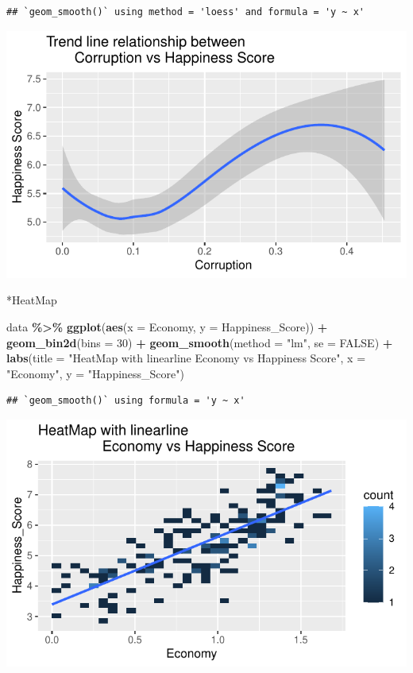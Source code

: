 \documentclass[
  11pt,
]{article}
\newenvironment{Shaded}{\begin{snugshade}}{\end{snugshade}}
\newcommand{\AttributeTok}[1]{\textcolor[rgb]{0.13,0.29,0.53}{#1}}
\newcommand{\ConstantTok}[1]{\textcolor[rgb]{0.56,0.35,0.01}{#1}}
\newcommand{\DecValTok}[1]{\textcolor[rgb]{0.00,0.00,0.81}{#1}}
\newcommand{\FunctionTok}[1]{\textcolor[rgb]{0.13,0.29,0.53}{\textbf{#1}}}
\newcommand{\NormalTok}[1]{#1}
\newcommand{\SpecialCharTok}[1]{\textcolor[rgb]{0.81,0.36,0.00}{\textbf{#1}}}
\newcommand{\StringTok}[1]{\textcolor[rgb]{0.31,0.60,0.02}{#1}}
\begin{document}
\begin{verbatim}
## `geom_smooth()` using method = 'loess' and formula = 'y ~ x'
\end{verbatim}

\begin{center}\includegraphics[width=0.7\linewidth]{Group_project_2_files/figure-latex/unnamed-chunk-13-1} \end{center}

*HeatMap

\begin{Shaded}
\begin{Highlighting}[]
\NormalTok{data }\SpecialCharTok{\%\textgreater{}\%}
\FunctionTok{ggplot}\NormalTok{(}\FunctionTok{aes}\NormalTok{(}\AttributeTok{x =}\NormalTok{ Economy, }\AttributeTok{y =}\NormalTok{ Happiness\_Score)) }\SpecialCharTok{+}
  \FunctionTok{geom\_bin2d}\NormalTok{(}\AttributeTok{bins =} \DecValTok{30}\NormalTok{) }\SpecialCharTok{+}  
  \FunctionTok{geom\_smooth}\NormalTok{(}\AttributeTok{method =} \StringTok{"lm"}\NormalTok{, }\AttributeTok{se =} \ConstantTok{FALSE}\NormalTok{) }\SpecialCharTok{+} 
  \FunctionTok{labs}\NormalTok{(}\AttributeTok{title =} \StringTok{"HeatMap with linearline }
\StringTok{                Economy vs Happiness Score"}\NormalTok{, }
           \AttributeTok{x =} \StringTok{"Economy"}\NormalTok{, }\AttributeTok{y =} \StringTok{"Happiness\_Score"}\NormalTok{)}
\end{Highlighting}
\end{Shaded}

\begin{verbatim}
## `geom_smooth()` using formula = 'y ~ x'
\end{verbatim}

\begin{center}\includegraphics[width=0.7\linewidth]{Group_project_2_files/figure-latex/unnamed-chunk-14-1} \end{center}
\end{document}
